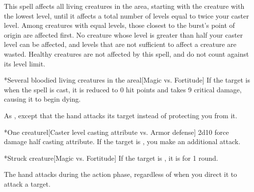 \spellline
\spelleffect This spell affects all \bloodied living creatures in the area, starting with the creature with the lowest level, until it affects a total number of levels equal to twice your caster level. Among creatures with equal levels, those closest to the burst's point of origin are affected first. No creature whose level is greater than half your caster level can be affected, and levels that are not sufficient to affect a creature are wasted. Healthy creatures are not affected by this spell, and do not count against its level limit.
\begin{spelltargets}*{Several bloodied living creatures in the area}l[Magic vs. Fortitude]
    \spellsuccess If the target is \bloodied when the spell is cast, it is reduced to 0 hit points and takes 9 critical damage, causing it to begin dying.
\end{spelltargets}
\spellline
{}

\spellrng{\rngmed}
\spelldur{\durshort \dismissable}
\spellline
\spelleffect As , except that the hand attacks its target instead of protecting you from it.
\begin{spelltarget}*{One creature}l[Caster level \add casting attribute vs. Armor defense]
    \spellsuccess 2d10 force damage \add half casting attribute. If the target is \bloodied, you make an additional attack.
    \begin{spelltarget}*{Struck creature}[Magic vs. Fortitude]
        \spellsuccess If the target is \bloodied, it is \dazed for 1 round.
    \end{spelltarget}
\end{spelltarget}
\spellnotes The hand attacks during the action phase, regardless of when you direct it to attack a target.

